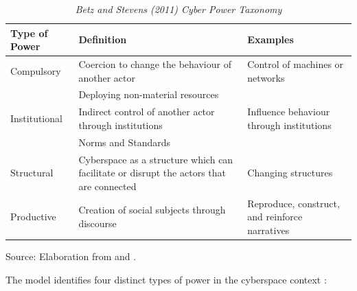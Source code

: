 \begin{table}[htbp]
  \centering
  \caption{\emph{Betz and Stevens (2011) Cyber Power Taxonomy}}
  \begin{tabularx}{\textwidth}{p{4cm}p{5cm}p{5cm}}
    \toprule
    \textbf{Type of Power} & \textbf{Definition} & \textbf{Examples} \\
    \midrule
    Compulsory & Coercion to change the behaviour of another actor & Control of machines or networks \\
     & Deploying non-material resources & \\
    \midrule
    Institutional & Indirect control of another actor through institutions & Influence behaviour through institutions \\
     & Norms and Standards & \\
    \midrule
    Structural & Cyberspace as a structure which can facilitate or disrupt the actors that are connected & Changing structures \\
    \midrule
    Productive & Creation of social subjects through discourse & Reproduce, construct, and reinforce narratives \\
    \bottomrule
  \end{tabularx}
  
  \raggedright
  \bigskip
  Source: Elaboration from \textcite{betz_2011_cyberspace} and \textcite{dunncavelty_2018_europes} .
\end{table}

The model identifies four distinct types of power in the cyberspace context \parencite{betz_2011_cyberspace, dunncavelty_2018_europes, vanhaaster_2016_assessing}:

